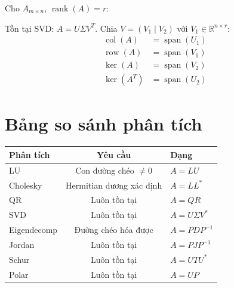 Cho $A_{m \times n}$, $\operatorname{rank}(A) = r$:

Tồn tại SVD: $A = U\Sigma V^T$. Chia $V = (V_1 \mid V_2)$ với $V_1 \in \mathbb{R}^{n \times r}$:
\begin{align}
\operatorname{col}(A) &= \operatorname{span}(U_1) \\
\operatorname{row}(A) &= \operatorname{span}(V_1) \\
\ker(A) &= \operatorname{span}(V_2) \\
\ker(A^T) &= \operatorname{span}(U_2)
\end{align}

\section{Bảng so sánh phân tích}

\begin{center}
\begin{tabular}{|l|c|l|}
\hline
\textbf{Phân tích} & \textbf{Yêu cầu} & \textbf{Dạng} \\
\hline
LU & Con đường chéo $\neq 0$ & $A = LU$ \\
Cholesky & Hermitian dương xác định & $A = LL^*$ \\
QR & Luôn tồn tại & $A = QR$ \\
SVD & Luôn tồn tại & $A = U\Sigma V^*$ \\
Eigendecomp & Đường chéo hóa được & $A = PDP^{-1}$ \\
Jordan & Luôn tồn tại & $A = PJP^{-1}$ \\
Schur & Luôn tồn tại & $A = UTU^*$ \\
Polar & Luôn tồn tại & $A = UP$ \\
\hline
\end{tabular}
\end{center}


